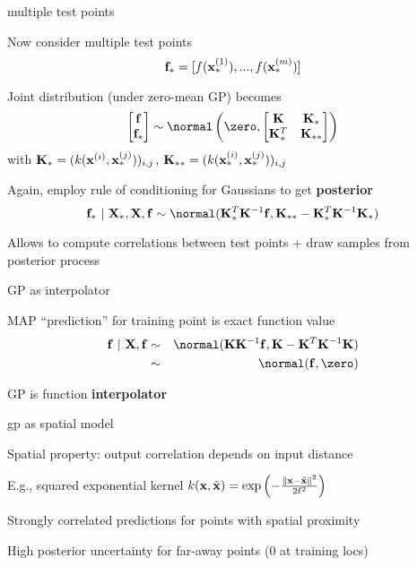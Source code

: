 \documentclass[11pt,compress,t,notes=noshow, xcolor=table]{beamer}
\begin{document}
\begin{framei}[sep=L]{multiple test points}
\item Now consider multiple test points
$$\fv_* = [f(\xi[1]_*), ..., f(\xi[m]_*)]$$
\item Joint distribution (under zero-mean GP) becomes
$$
    \begin{bmatrix} \fv \\ \fv_* \end{bmatrix} \sim  
    \normal\left(\zero, \begin{bmatrix} \Kmat & \Kmat_* \\ \Kmat_*^T & \Kmat_{**} \end{bmatrix}\right)
  $$
with $\Kmat_* = (k(\xi, \xv_*^{(j)}))_{i,j}$, $\Kmat_{**} = (k(\xi[i]_*, \xi[j]_*))_{i,j}$
\item Again, employ rule of conditioning for Gaussians to get \textbf{posterior}
$$\fv_* ~|~ \Xmat_*, \Xmat, \fv \sim \normal(\Kmat_{*}^{T}\Kmat^{-1}\fv, \Kmat_{**} - \Kmat_*^T \Kmat ^{-1}\Kmat_*)$$
\item Allows to compute correlations between test points + draw samples from posterior process
\end{framei}

\begin{framei}[sep=L]{GP as interpolator}
\item MAP ``prediction'' for training point is exact function value
\begin{eqnarray*}
\fv ~|~ \Xmat, \fv &\sim& \normal(\Kmat\Kmat^{-1}\fv, \Kmat - \Kmat^T \Kmat^{-1} \Kmat) \\ &\sim& \normal(\fv, \zero)
\end{eqnarray*}
\item GP is function \textbf{interpolator}
\vfill
{}
\end{framei}

\begin{framei}[sep=L]{gp as spatial model}
\item Spatial property: output correlation depends on input distance
\item E.g., squared exponential kernel $k(\xv, \tilde{\xv}) = \exp \left(-\frac{\| \xv - \tilde{\xv} \|^2}{2\ls^2} \right)$
\item Strongly correlated predictions for points with spatial proximity
\item High posterior uncertainty for far-away points (0 at training locs)
\vfill
{}
\end{framei}
\end{document}
